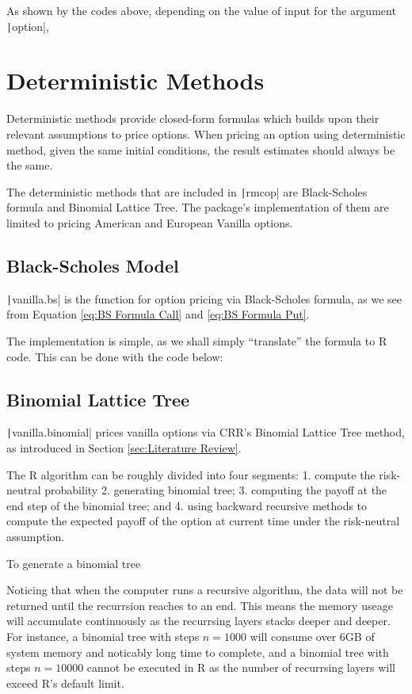 As shown by the codes above, depending on the value of input for the argument \texttt|option|, 






\section{Deterministic Methods}

Deterministic methods provide closed-form formulas which builds upon their relevant assumptions to price options. When pricing an option using deterministic method, given the same initial conditions, the result estimates should always be the same.

The deterministic methods that are included in \texttt|rmcop| are Black-Scholes formula and Binomial Lattice Tree. The package's implementation of them are limited to pricing American and European Vanilla options.

\subsection{Black-Scholes Model}

\texttt|vanilla.bs| is the function for option pricing via Black-Scholes formula, as we see from Equation \ref{eq:BS Formula Call} and \ref{eq:BS Formula Put}.

The implementation is simple, as we shall simply ``translate'' the formula to R code. This can be done with the code below:

\subsection{Binomial Lattice Tree}

\texttt|vanilla.binomial| prices vanilla options via CRR's Binomial Lattice Tree method, as introduced in Section \ref{sec:Literature Review}.

The R algorithm can be roughly divided into four segments: 1. compute the risk-neutral probability 2. generating binomial tree; 3. computing the payoff at the end step of the binomial tree; and 4. using backward recursive methods to compute the expected payoff of the option at current time under the risk-neutral assumption.

To generate a binomial tree





Noticing that when the computer runs a recursive algorithm, the data will not be returned until the recurrsion reaches to an end. This means the memory useage will accumulate continuously as the recurrsing layers stacks deeper and deeper. For instance, a binomial tree with steps $n=1000$ will consume over 6GB of system memory and noticably long time to complete, and a binomial tree with steps $n=10000$ cannot be executed in R as the number of recurrsing layers will exceed R's default limit.

